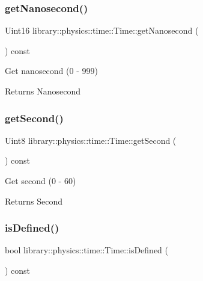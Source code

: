 \subsubsection{\texorpdfstring{get\+Nanosecond()}{getNanosecond()}}
{\footnotesize\ttfamily Uint16 library\+::physics\+::time\+::\+Time\+::get\+Nanosecond (\begin{DoxyParamCaption}{ }\end{DoxyParamCaption}) const}



Get nanosecond (0 -\/ 999) 

\begin{DoxyReturn}{Returns}
Nanosecond 
\end{DoxyReturn}
\mbox{\label{classlibrary_1_1physics_1_1time_1_1_time_aca543eadd3112d54a0d014512f99e90a}} 
\subsubsection{\texorpdfstring{get\+Second()}{getSecond()}}
{\footnotesize\ttfamily Uint8 library\+::physics\+::time\+::\+Time\+::get\+Second (\begin{DoxyParamCaption}{ }\end{DoxyParamCaption}) const}



Get second (0 -\/ 60) 

\begin{DoxyReturn}{Returns}
Second 
\end{DoxyReturn}
\mbox{\label{classlibrary_1_1physics_1_1time_1_1_time_a45736fe7072e922a9d9c3829c7517b88}} 
\subsubsection{\texorpdfstring{is\+Defined()}{isDefined()}}
{\footnotesize\ttfamily bool library\+::physics\+::time\+::\+Time\+::is\+Defined (\begin{DoxyParamCaption}{ }\end{DoxyParamCaption}) const}



